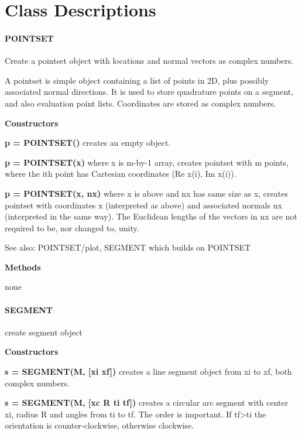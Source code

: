 \appendix

\setlength{\parskip}{\baselineskip}
\setlength{\parindent}{0pt}

\section{Class Descriptions}


\paragraph{POINTSET}

Create a pointset object with locations and normal vectors as
complex numbers.

A pointset is simple object containing a list of points in 2D, plus possibly
associated normal directions.  It is used to store quadrature points on a
segment, and also evaluation point lists. Coordinates are stored as 
complex numbers.

\textbf{Constructors}

\textbf{p = POINTSET()}
creates an empty object.
 
\textbf{p = POINTSET(x)} where x is m-by-1 array, creates pointset with m points, where
the ith point has Cartesian coordinates (Re x(i), Im x(i)).
  
\textbf{p = POINTSET(x, nx)} where x is above and nx has same size as x, creates
pointset with coordinates x (interpreted as above) and associated normals
nx (interpreted in the same way). The Euclidean lengths of the vectors in
nx are not required to be, nor changed to, unity.

See also: POINTSET/plot, SEGMENT which builds on POINTSET

\textbf{Methods}

none


\newpage

\paragraph{SEGMENT} create segment object

\textbf{Constructors}

\textbf{s = SEGMENT(M, [xi xf])}  creates a line segment object from xi to xf, both
complex numbers.

\textbf{s = SEGMENT(M, [xc R ti tf])} creates a circular arc segment with center
xi, radius R and angles from ti to tf. The order is important. If tf>ti
the orientation is counter-clockwise, otherwise clockwise.
  
